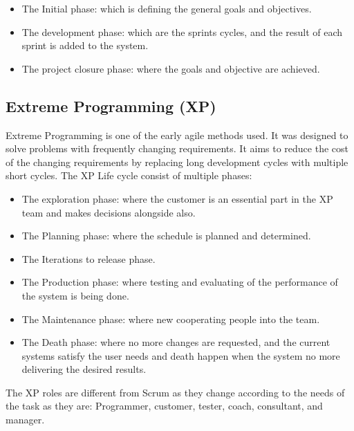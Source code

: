 \documentclass[conference,onecolumn]{IEEEtran}
\begin{document}
\begin{itemize}
	\item The Initial phase: which is defining the general goals and objectives.
	\item The development phase: which are the sprints cycles, and the result of each sprint is added to the system.
	\item The project closure phase: where the goals and objective are achieved.
\end{itemize}

\subsection{Extreme Programming (XP)}
Extreme Programming is one of the early agile methods used. It was designed to solve problems with frequently changing requirements. It aims to reduce the cost of the changing requirements by replacing long development cycles with multiple short cycles. The XP Life cycle consist of multiple phases:

\begin{itemize}
	\item The exploration phase: where the customer is an essential part in the XP team and makes decisions alongside also.
	\item The Planning phase: where the schedule is planned and determined.
	\item The Iterations to release phase.
	\item The Production phase: where testing and evaluating of the performance of the system is being done.
	\item The Maintenance phase: where new cooperating people into the team.
	\item The Death phase: where no more changes are requested, and the current systems satisfy the user needs and death happen when the system no more delivering the desired results.
\end{itemize}

The XP roles are different from Scrum as they change according to the needs of the task as they are: Programmer, customer, tester, coach, consultant, and manager.
 
\end{document}
